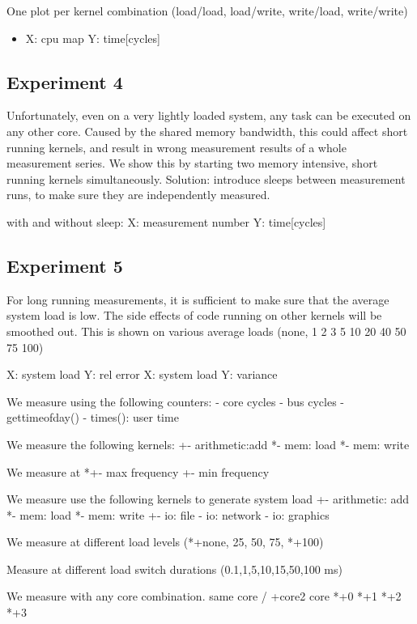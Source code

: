 \documentclass[a4paper,12pt]{article}
\begin{document}
One plot per kernel combination (load/load, load/write, write/load, write/write)
\begin{itemize}
\item X: cpu map Y: time[cycles]
\end{itemize}


\subsection{Experiment 4}
Unfortunately, even on a very lightly loaded system, any task can be executed on
any other core. Caused by the shared memory bandwidth, this could affect short
running kernels, and result in wrong measurement results of a whole measurement
series. We show this by starting two memory intensive, short running kernels
simultaneously. Solution: introduce sleeps between measurement runs, to make
sure they are independently measured.

with and without sleep: X: measurement number Y: time[cycles]

\subsection{Experiment 5}
For long running measurements, it is sufficient to make sure that the average
system load is low. The side effects of code running on other kernels will be
smoothed out. This is shown on various average loads (none, 1 2 3 5 10 20 40 50
75 100)

X: system load Y: rel error
X: system load Y: variance

We measure using the following counters:
- core cycles
- bus cycles
- gettimeofday()
- times(): user time

We measure the following kernels:
+- arithmetic:add
*- mem: load
*- mem: write

We measure at 
*+- max frequency
+- min frequency

We measure use the following kernels to generate system load
+- arithmetic: add
*- mem: load
*- mem: write
+- io: file 
- io: network
- io: graphics

We measure at different load levels (*+none, 25, 50, 75, *+100)

Measure at different load switch durations (0.1,1,5,10,15,50,100 ms)

We measure with any core combination.
same core / +core2
core *+0 *+1 *+2 *+3
\end{document}
